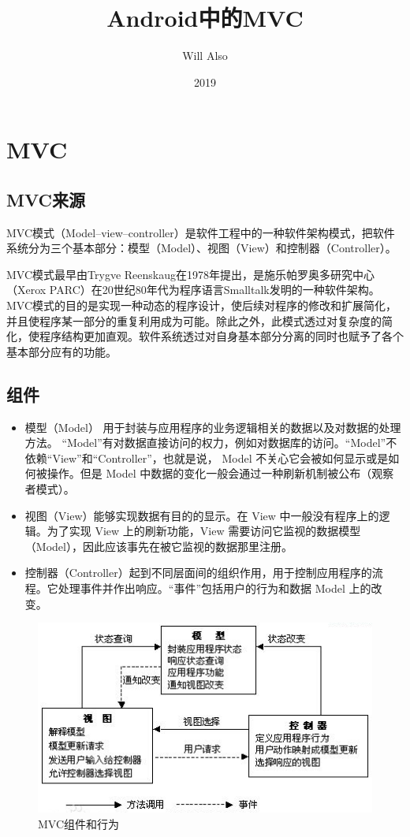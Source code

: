 \documentclass[a4paper,12pt]{ctexart}
\title{Android中的MVC}
\author{Will Also}
\date{2019}
\begin{document}
	\maketitle
	\tableofcontents
	\section{MVC}
	\subsection{MVC来源}
	MVC模式（Model–view–controller）是软件工程中的一种软件架构模式，把软件系统分为三个基本部分：模型（Model）、视图（View）和控制器（Controller）。
	\par MVC模式最早由Trygve Reenskaug在1978年提出，是施乐帕罗奥多研究中心（Xerox PARC）在20世纪80年代为程序语言Smalltalk发明的一种软件架构。MVC模式的目的是实现一种动态的程序设计，使后续对程序的修改和扩展简化，并且使程序某一部分的重复利用成为可能。除此之外，此模式透过对复杂度的简化，使程序结构更加直观。软件系统透过对自身基本部分分离的同时也赋予了各个基本部分应有的功能。
	\subsection{组件}
	\begin{itemize}
		\item 模型（Model） 用于封装与应用程序的业务逻辑相关的数据以及对数据的处理方法。
		 “Model”有对数据直接访问的权力，例如对数据库的访问。“Model”不依赖“View”和“Controller”，也就是说， Model 不关心它会被如何显示或是如何被操作。但是 Model 中数据的变化一般会通过一种刷新机制被公布（观察者模式）。
		 \item 视图（View）能够实现数据有目的的显示。在 View 中一般没有程序上的逻辑。为了实现 View 上的刷新功能，View 需要访问它监视的数据模型（Model），因此应该事先在被它监视的数据那里注册。
		 \item 控制器（Controller）起到不同层面间的组织作用，用于控制应用程序的流程。它处理事件并作出响应。“事件”包括用户的行为和数据 Model 上的改变。
	\end{itemize}
	\begin{figure}[ht]
		\centering
		\includegraphics[]{image/1.png}
		\caption{MVC组件和行为}
	\end{figure}
\end{document}
